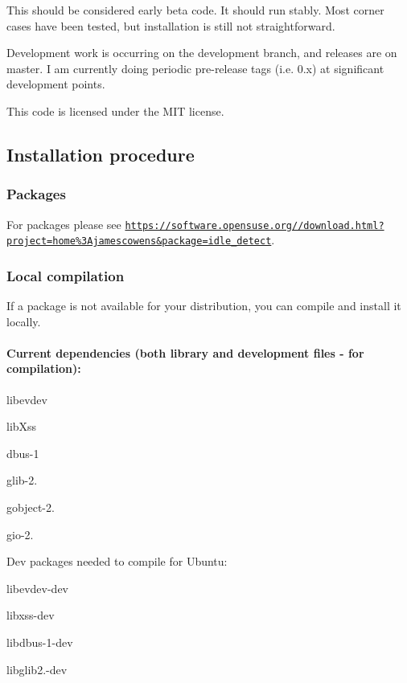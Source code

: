 This should be considered early beta code. It should run stably. Most corner cases have been tested, but installation is still not straightforward.

Development work is occurring on the development branch, and releases are on master. I am currently doing periodic pre-\/release tags (i.\+e. 0.\+x) at significant development points.

This code is licensed under the M\+IT license. \subsection*{Installation procedure}

\subsubsection*{Packages}

For packages please see \href{https://software.opensuse.org//download.html?project=home%3Ajamescowens&package=idle_detect}{\tt https\+://software.\+opensuse.\+org//download.\+html?project=home\%3\+Ajamescowens\&package=idle\+\_\+detect}.

\subsubsection*{Local compilation}

If a package is not available for your distribution, you can compile and install it locally.

\paragraph*{Current dependencies (both library and development files -\/ for compilation)\+:}


\begin{DoxyItemize}
\item libevdev
\item lib\+Xss
\item dbus-\/1
\item glib-\/2.
\item gobject-\/2.
\item gio-\/2.
\end{DoxyItemize}

Dev packages needed to compile for Ubuntu\+:
\begin{DoxyItemize}
\item libevdev-\/dev
\item libxss-\/dev
\item libdbus-\/1-\/dev
\item libglib2.-\/dev
\end{DoxyItemize}

